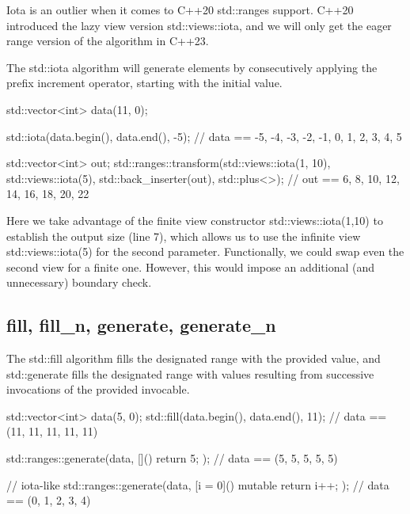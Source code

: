 Iota is an outlier when it comes to C++20 std::ranges support. C++20 introduced the lazy view version std::views::iota, and we will only get the eager range version of the algorithm in C++23.



The std::iota algorithm will generate elements by consecutively applying the prefix increment operator, starting with the initial value.

\begin{box-note}
\begin{cppcode}
std::vector<int> data(11, 0);

std::iota(data.begin(), data.end(), -5); 
// data == { -5, -4, -3, -2, -1, 0, 1, 2, 3, 4, 5 }

std::vector<int> out;
std::ranges::transform(std::views::iota(1, 10), std::views::iota(5), 
                       std::back_inserter(out), std::plus<>{});
// out == { 6, 8, 10, 12, 14, 16, 18, 20, 22 }
\end{cppcode}
\end{box-note}

Here we take advantage of the finite view constructor std::views::iota(1,10) to establish the output size (line 7), which allows us to use the infinite view std::views::iota(5) for the second parameter. Functionally, we could swap even the second view for a finite one. However, this would impose an additional (and unnecessary) boundary check.

\subsection{fill, fill\_n, generate, generate\_n}



The std::fill algorithm fills the designated range with the provided value, and std::generate fills the designated range with values resulting from successive invocations of the provided invocable.

\begin{box-note}
\begin{cppcode}
std::vector<int> data(5, 0);
std::fill(data.begin(), data.end(), 11);
// data == (11, 11, 11, 11, 11)

std::ranges::generate(data, []() { return 5; });
// data == (5, 5, 5, 5, 5)

// iota-like
std::ranges::generate(data, [i = 0]() mutable { return i++; });
// data == (0, 1, 2, 3, 4)
\end{cppcode}
\end{box-note}

